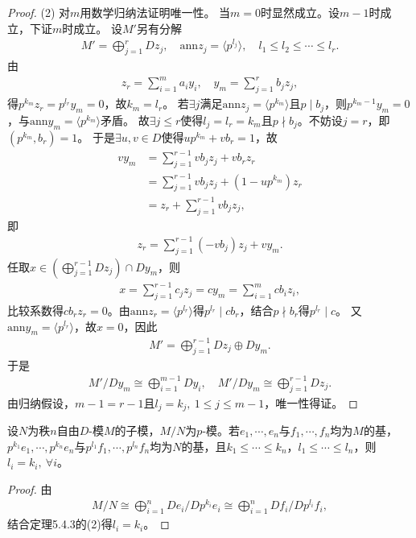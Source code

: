 \documentclass[../../main.tex]{subfiles}%
\begin{document}
\begin{proof}
(2) 对$m$用数学归纳法证明唯一性。
当$m=0$时显然成立。设$m-1$时成立，下证$m$时成立。
设$M'$另有分解
\begin{align*}
M'=\bigoplus\limits_{j=1}^{r}Dz_j,\quad \mathrm{ann}z_j=\langle p^{l_j}\rangle,\quad l_1\leqslant l_2\leqslant\cdots\leqslant l_r.
\end{align*}
由
\begin{align*}
z_r=\sum\limits_{i=1}^{m}a_iy_i,\quad y_m=\sum\limits_{j=1}^{r}b_jz_j,
\end{align*}
得$p^{k_m}z_r=p^{l_r}y_m=0$，故$k_m=l_r$。
若$\exists j$满足$\mathrm{ann}z_j=\langle p^{k_m}\rangle$且$p\mid b_j$，则$p^{k_m-1}y_m=0$，与$\mathrm{ann}y_m=\langle p^{k_m}\rangle$矛盾。
故$\exists j\leqslant r$使得$l_j=l_r=k_m$且$p\nmid b_j$。不妨设$j=r$，即$(p^{k_m},b_r)=1$。
于是$\exists u,v\in D$使得$up^{k_m}+vb_r=1$，故
\begin{align*}
vy_m&=\sum\limits_{j=1}^{r-1}vb_jz_j+vb_rz_r\\
&=\sum\limits_{j=1}^{r-1}vb_jz_j+(1-up^{k_m})z_r\\
&=z_r+\sum\limits_{j=1}^{r-1}vb_jz_j,
\end{align*}
即
\begin{align*}
z_r=\sum\limits_{j=1}^{r-1}(-vb_j)z_j+vy_m.
\end{align*}
任取$x\in\left(\bigoplus\limits_{j=1}^{r-1}Dz_j\right)\cap Dy_m$，则
\begin{align*}
x=\sum\limits_{j=1}^{r-1}c_jz_j=cy_m=\sum\limits_{i=1}^{m}cb_iz_i,
\end{align*}
比较系数得$cb_rz_r=0$。由$\mathrm{ann}z_r=\langle p^{l_r}\rangle$得$p^{l_r}\mid cb_r$，结合$p\nmid b_r$得$p^{l_r}\mid c$。
又$\mathrm{ann}y_m=\langle p^{l_r}\rangle$，故$x=0$，因此
\begin{align*}
M'=\bigoplus\limits_{j=1}^{r-1}Dz_j\oplus Dy_m.
\end{align*}
于是
\begin{align*}
M'/Dy_m\cong\bigoplus\limits_{i=1}^{m-1}Dy_i,\quad M'/Dy_m\cong\bigoplus\limits_{j=1}^{r-1}Dz_j.
\end{align*}
由归纳假设，$m-1=r-1$且$l_j=k_j,\ 1\leqslant j\leqslant m-1$，唯一性得证。
\end{proof}

\begin{corollary}
设$N$为秩$n$自由$D$-模$M$的子模，$M/N$为$p$-模。若$e_1,\cdots,e_n$与$f_1,\cdots,f_n$均为$M$的基，$p^{k_1}e_1,\cdots,p^{k_n}e_n$与$p^{l_1}f_1,\cdots,p^{l_n}f_n$均为$N$的基，且$k_1\leqslant\cdots\leqslant k_n$，$l_1\leqslant\cdots\leqslant l_n$，则$l_i=k_i,\ \forall i$。
\end{corollary}
\begin{proof}
由
\begin{align*}
M/N\cong\bigoplus\limits_{i=1}^{n}De_i/Dp^{k_i}e_i\cong\bigoplus\limits_{i=1}^{n}Df_i/Dp^{l_i}f_i,
\end{align*}
结合定理5.4.3的(2)得$l_i=k_i$。
\end{proof}
\end{document}

